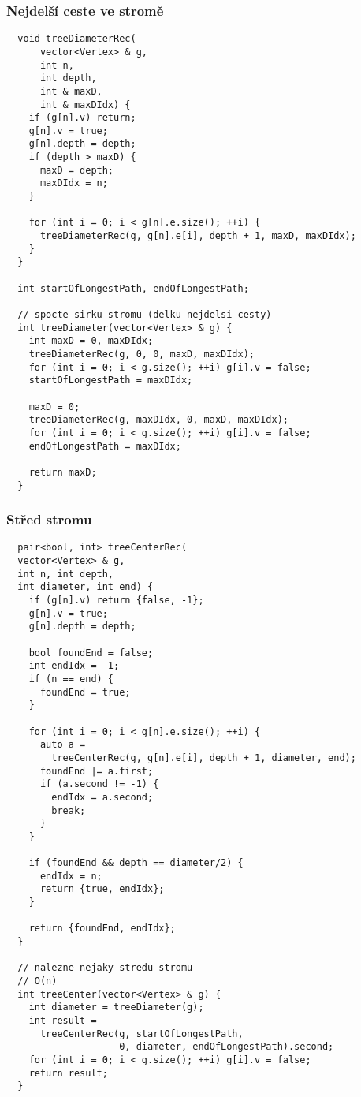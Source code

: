 \documentclass{article}
\begin{document}
\subsubsection{Nejdelší ceste ve stromě}
\begin{lstlisting}
  void treeDiameterRec(
      vector<Vertex> & g,
      int n,
      int depth,
      int & maxD,
      int & maxDIdx) {
    if (g[n].v) return;
    g[n].v = true;
    g[n].depth = depth;
    if (depth > maxD) {
      maxD = depth;
      maxDIdx = n;
    }

    for (int i = 0; i < g[n].e.size(); ++i) {
      treeDiameterRec(g, g[n].e[i], depth + 1, maxD, maxDIdx);
    }
  }

  int startOfLongestPath, endOfLongestPath;

  // spocte sirku stromu (delku nejdelsi cesty)
  int treeDiameter(vector<Vertex> & g) {
    int maxD = 0, maxDIdx;
    treeDiameterRec(g, 0, 0, maxD, maxDIdx);
    for (int i = 0; i < g.size(); ++i) g[i].v = false;
    startOfLongestPath = maxDIdx;

    maxD = 0;
    treeDiameterRec(g, maxDIdx, 0, maxD, maxDIdx);
    for (int i = 0; i < g.size(); ++i) g[i].v = false;
    endOfLongestPath = maxDIdx;

    return maxD;
  }
\end{lstlisting}

\subsubsection{Střed stromu}
\begin{lstlisting}
  pair<bool, int> treeCenterRec(
  vector<Vertex> & g,
  int n, int depth,
  int diameter, int end) {
    if (g[n].v) return {false, -1};
    g[n].v = true;
    g[n].depth = depth;

    bool foundEnd = false;
    int endIdx = -1;
    if (n == end) {
      foundEnd = true;
    }

    for (int i = 0; i < g[n].e.size(); ++i) {
      auto a = 
        treeCenterRec(g, g[n].e[i], depth + 1, diameter, end);
      foundEnd |= a.first;
      if (a.second != -1) {
        endIdx = a.second;
        break;
      }
    }

    if (foundEnd && depth == diameter/2) {
      endIdx = n;
      return {true, endIdx};
    }

    return {foundEnd, endIdx};
  }

  // nalezne nejaky stredu stromu
  // O(n)
  int treeCenter(vector<Vertex> & g) {
    int diameter = treeDiameter(g);
    int result = 
      treeCenterRec(g, startOfLongestPath,
                    0, diameter, endOfLongestPath).second;
    for (int i = 0; i < g.size(); ++i) g[i].v = false;
    return result;
  }
\end{lstlisting}
\end{document}
